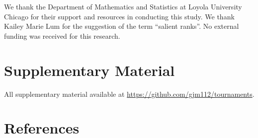 \documentclass[
  12pt,
]{article}
\begin{document}
We thank the Department of Mathematics and Statistics at Loyola
University Chicago for their support and resources in conducting this
study. We thank Kailey Marie Lum for the suggestion of the term
``salient ranks''. No external funding was received for this research.

\section*{Supplementary Material}\label{supplementary-material}

All supplementary material available at
\url{https://github.com/gjm112/tournaments}.

\section{References}\label{references}
\end{document}
